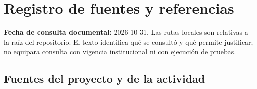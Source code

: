 \documentclass[12pt,a4paper]{report}
\begin{document}
\section{Registro de fuentes y
referencias}\label{fuentes-registro-de-fuentes-y-referencias}

\textbf{Fecha de consulta documental:} 2026-10-31. Las rutas locales son
relativas a la raíz del repositorio. El texto identifica qué se consultó
y qué permite justificar; no equipara consulta con vigencia
institucional ni con ejecución de pruebas.

\subsection{Fuentes del proyecto y de la
actividad}\label{fuentes-fuentes-del-proyecto-y-de-la-actividad}
\end{document}
